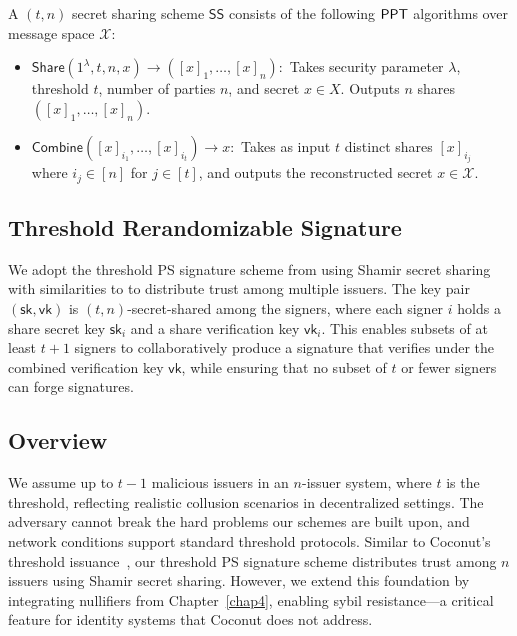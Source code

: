 \begin{definition}
A $(t,n)$ secret sharing scheme $\mathsf{SS}$ consists of the following $\mathsf{PPT}$ algorithms over message space $\mathcal{X}$:
\begin{itemize}
    \item $\mathsf{Share}(1^{\lambda}, t, n, x) \to ([x]_1, \dots, [x]_n):$ Takes security parameter $\lambda$, threshold $t$, number of parties $n$, and secret $x \in X$. Outputs $n$ shares $([x]_1, \dots, [x]_n)$.
    
    \item $\mathsf{Combine}([x]_{i_1}, \dots, [x]_{i_t}) \to x:$ Takes as input $t$ distinct shares $[x]_{i_j}$ where $i_j \in [n]$ for $j \in [t]$, and outputs the reconstructed secret $x \in \mathcal{X}$.
\end{itemize}
\end{definition}




\subsection{Threshold Rerandomizable Signature}

We adopt the threshold PS signature scheme from \cite{tomescu_utt_2022} using Shamir secret sharing with similarities to \cite{sonnino_coconut_2020} to distribute trust among multiple issuers. The key pair $(\mathsf{sk}, \mathsf{vk})$ is $(t,n)$-secret-shared among the signers, where each signer $i$ holds a share secret key $\mathsf{sk}_i$ and a share verification key $\mathsf{vk}_i$. This enables subsets of at least $t+1$ signers to collaboratively produce a signature that verifies under the combined verification key $\mathsf{vk}$, while ensuring that no subset of $t$ or fewer signers can forge signatures.


\subsection{Overview}
We assume up to $t-1$ malicious issuers in an $n$-issuer system, where $t$ is the threshold, reflecting realistic collusion scenarios in decentralized settings. The adversary cannot break the hard problems our schemes are built upon, and network conditions support standard threshold protocols. Similar to Coconut’s threshold issuance~\cite{sonnino_coconut_2020}, our threshold PS signature scheme distributes trust among $n$ issuers using Shamir secret sharing. However, we extend this foundation by integrating nullifiers from Chapter~\ref{chap4}, enabling sybil resistance—a critical feature for identity systems that Coconut does not address.

